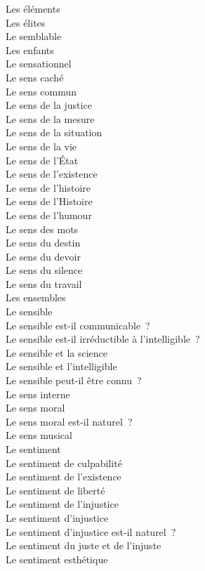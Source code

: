 \documentclass[a4paper,12pt]{article}
\begin{document}
Les éléments \\
Les élites \\
Le semblable \\
Les enfants \\
Le sensationnel \\
Le sens caché \\
Le sens commun \\
Le sens de la justice \\
Le sens de la mesure \\
Le sens de la situation \\
Le sens de la vie \\
Le sens de l'État \\
Le sens de l'existence \\
Le sens de l'histoire \\
Le sens de l'Histoire \\
Le sens de l'humour \\
Le sens des mots \\
Le sens du destin \\
Le sens du devoir \\
Le sens du silence \\
Le sens du travail \\
Les ensembles \\
Le sensible \\
Le sensible est-il communicable ? \\
Le sensible est-il irréductible à l'intelligible ? \\
Le sensible et la science \\
Le sensible et l'intelligible \\
Le sensible peut-il être connu ? \\
Le sens interne \\
Le sens moral \\
Le sens moral est-il naturel ? \\
Le sens musical \\
Le sentiment \\
Le sentiment de culpabilité \\
Le sentiment de l'existence \\
Le sentiment de liberté \\
Le sentiment de l'injustice \\
Le sentiment d'injustice \\
Le sentiment d'injustice est-il naturel ? \\
Le sentiment du juste et de l'injuste \\
Le sentiment esthétique \\
\end{document}

